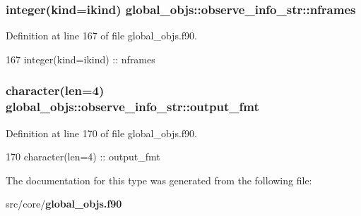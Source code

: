 \subsubsection[{nframes}]{\setlength{\rightskip}{0pt plus 5cm}integer(kind=ikind) global\+\_\+objs\+::observe\+\_\+info\+\_\+str\+::nframes}\label{structglobal__objs_1_1observe__info__str_a2e4f6a21c1402a9f76c983d79b86adaa}


Definition at line 167 of file global\+\_\+objs.\+f90.


\begin{DoxyCode}
167     \textcolor{keywordtype}{integer(kind=ikind)} :: nframes
\end{DoxyCode}
\subsubsection[{output\+\_\+fmt}]{\setlength{\rightskip}{0pt plus 5cm}character(len=4) global\+\_\+objs\+::observe\+\_\+info\+\_\+str\+::output\+\_\+fmt}\label{structglobal__objs_1_1observe__info__str_a6be62b984ee978c10243302805bb7357}


Definition at line 170 of file global\+\_\+objs.\+f90.


\begin{DoxyCode}
170     \textcolor{keywordtype}{character(len=4)} :: output\_fmt
\end{DoxyCode}


The documentation for this type was generated from the following file\+:\begin{DoxyCompactItemize}
\item 
src/core/{\bf global\+\_\+objs.\+f90}\end{DoxyCompactItemize}
